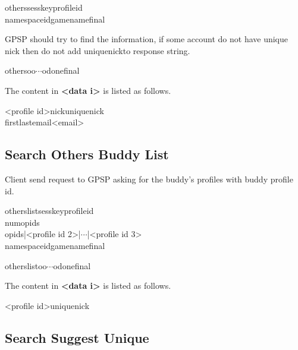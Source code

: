 \documentclass[oneside,titlepage,a4paper]{Definition/retrospy} %
\begin{document}
\begin{mybox}
	\tbs others\tbs\tbs sesskey\tbs<session key>\tbs profileid\tbs<profile id>\\\tbs namespaceid\tbs <namespace id>\tbs gamename\tbs<game name>\tbs final\tbs
\end{mybox}
\ServerResponse
GPSP should try to find the information, if some account do not have unique nick then do not add \tbs uniquenick\tbs to response string.
\begin{mybox}
\tbs others\tbs\tbs o\tbs o\tbs $\cdots$\tbs odone\tbs final\tbs
\end{mybox}
The content in \textbf{<data i>} is listed as follows.
\begin{mybox}
	<profile id>\tbs nick\tbs <nick name>\tbs uniquenick\tbs<unique nick>\\\tbs first\tbs<first name>\tbs last\tbs <last name>\tbs email\tbs<email>
\end{mybox}


\subsection{Search Others Buddy List}
Client send request to GPSP asking for the buddy's profiles with buddy profile id.
\ClientRequest

\begin{mybox}
	\tbs otherslist\tbs\tbs sesskey\tbs <session key>\tbs profileid\tbs<profile id>\\
	\tbs numopids\tbs<number of recieved buddy profiles>\\
	\tbs opids\tbs <profile id 1>|<profile id 2>|$\cdots$|<profile id 3>\\
	\tbs namespaceid\tbs <namespace id>\tbs gamename\tbs <game name>\tbs final\tbs
\end{mybox}
\ServerResponse

\begin{mybox}
	\tbs otherslist\tbs\tbs o\tbs<data 1>\tbs o\tbs<data 2>\tbs $\cdots$\tbs <data n>\tbs odone\tbs final\tbs
\end{mybox}
The content in \textbf{<data i>} is listed as follows.
\begin{mybox}
	<profile id>\tbs uniquenick\tbs <unique nick>
\end{mybox}



\subsection{Search Suggest Unique}
\end{document}
